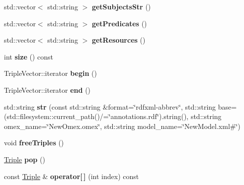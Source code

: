 \begin{DoxyCompactItemize}
std\+::vector$<$ std\+::string $>$ {\bfseries get\+Subjects\+Str} ()
\item 
\mbox{\label{classomexmeta_1_1Triples_a63639c08caac19e6c5cbf30bb28292d0}} 
std\+::vector$<$ std\+::string $>$ {\bfseries get\+Predicates} ()
\item 
\mbox{\label{classomexmeta_1_1Triples_aa875120a73cb1618be9e699e8bfb08c4}} 
std\+::vector$<$ std\+::string $>$ {\bfseries get\+Resources} ()
\item 
\mbox{\label{classomexmeta_1_1Triples_adc86427b3563d04849336a8da7566451}} 
int {\bfseries size} () const
\item 
\mbox{\label{classomexmeta_1_1Triples_aa6735eb506ff0d5a3179fab3af3b2602}} 
Triple\+Vector\+::iterator {\bfseries begin} ()
\item 
\mbox{\label{classomexmeta_1_1Triples_a4312337b242280bcb119908c0334bfd8}} 
Triple\+Vector\+::iterator {\bfseries end} ()
\item 
\mbox{\label{classomexmeta_1_1Triples_a62d145b37f9d1e4b48b2164b8c6c0990}} 
std\+::string {\bfseries str} (const std\+::string \&format=\char`\"{}rdfxml-\/abbrev\char`\"{}, std\+::string base=(std\+::filesystem\+::current\+\_\+path()/=\char`\"{}annotations.\+rdf\char`\"{}).string(), std\+::string omex\+\_\+name=\char`\"{}New\+Omex.\+omex\char`\"{}, std\+::string model\+\_\+name=\char`\"{}New\+Model.\+xml\#\char`\"{})
\item 
\mbox{\label{classomexmeta_1_1Triples_ad0c5839b0f49d6427cf53004baf9b0f4}} 
void {\bfseries free\+Triples} ()
\item 
\mbox{\label{classomexmeta_1_1Triples_a5dad8f2cde0a3f6c0ce341338f80b0cd}} 
\hyperlink{classomexmeta_1_1Triple}{Triple} {\bfseries pop} ()
\item 
\mbox{\label{classomexmeta_1_1Triples_a43d540423a436986d9f72d7cf0f02d72}} 
const \hyperlink{classomexmeta_1_1Triple}{Triple} \& {\bfseries operator\mbox{[}$\,$\mbox{]}} (int index) const

\end{DoxyCompactItemize}
